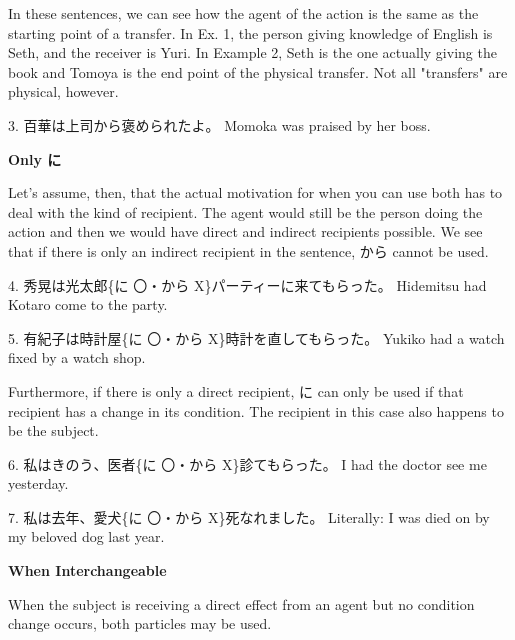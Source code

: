 \par{ In these sentences, we can see how the agent of the action is the same as the starting point of a transfer. In Ex. 1, the person giving knowledge of English is Seth, and the receiver is Yuri. In Example 2, Seth is the one actually giving the book and Tomoya is the end point of the physical transfer. Not all "transfers" are physical, however. }

\par{3. 百華は上司から褒められたよ。 \hfill\break
Momoka was praised by her boss. }

\begin{center}
 \textbf{Only に }
\end{center}

\par{ Let's assume, then, that the actual motivation for when you can use both has to deal with the kind of recipient. The agent would still be the person doing the action and then we would have direct and indirect recipients possible. We see that if there is only an indirect recipient in the sentence, から cannot be used. }

\par{4. 秀晃は光太郎\{に 〇・から X\}パーティーに来てもらった。 \hfill\break
Hidemitsu had Kotaro come to the party. }

\par{5. 有紀子は時計屋\{に 〇・から X\}時計を直してもらった。 \hfill\break
Yukiko had a watch fixed by a watch shop. }

\par{ Furthermore, if there is only a direct recipient, に can only be used if that recipient has a change in its condition. The recipient in this case also happens to be the subject. }

\par{6. 私はきのう、医者\{に 〇・から X\}診てもらった。 \hfill\break
I had the doctor see me yesterday. }

\par{7. 私は去年、愛犬\{に 〇・から X\}死なれました。 \hfill\break
Literally: I was died on by my beloved dog last year. }

\begin{center}
\textbf{When Interchangeable }
\end{center}

\par{ When the subject is receiving a direct effect from an agent but no condition change occurs, both particles may be used. }

